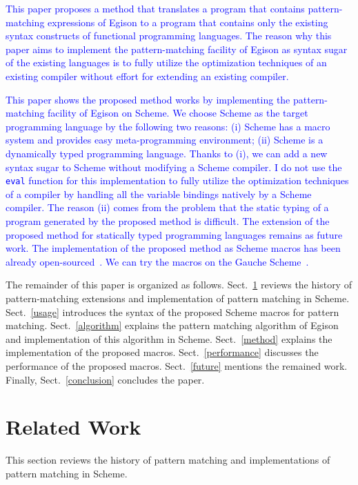 \documentclass[acmlarge]{acmart}
\newcommand{\new}[1]{\textcolor{blue}{#1}}
\begin{document}
\new{
This paper proposes a method that translates a program that contains pattern-matching expressions of Egison to a program that contains only the existing syntax constructs of functional programming languages.
The reason why this paper aims to implement the pattern-matching facility of Egison as syntax sugar of the existing languages is to fully utilize the optimization techniques of an existing compiler without effort for extending an existing compiler.
}%

\new{
This paper shows the proposed method works by implementing the pattern-matching facility of Egison on Scheme.
We choose Scheme as the target programming language by the following two reasons:
(i) Scheme has a macro system and provides easy meta-programming environment;
(ii) Scheme is a dynamically typed programming language.
Thanks to (i), we can add a new syntax sugar to Scheme without modifying a Scheme compiler.
I do not use the \lstinline{eval} function for this implementation to fully utilize the optimization techniques of a compiler by handling all the variable bindings natively by a Scheme compiler.
The reason (ii) comes from the problem that the static typing of a program generated by the proposed method is difficult.
The extension of the proposed method for statically typed programming languages remains as future work.
The implementation of the proposed method as Scheme  macros has been already open-sourced~\cite{egisonScheme}.
We can try the macros on the Gauche Scheme~\cite{gaucheWeb}.
}%

The remainder of this paper is organized as follows.
Sect.~\ref{history} reviews the history of pattern-matching extensions and implementation of pattern matching in Scheme.
Sect.~\ref{usage} introduces the syntax of the proposed Scheme macros for pattern matching.
Sect.~\ref{algorithm} explains the pattern matching algorithm of Egison and implementation of this algorithm in Scheme.
Sect.~\ref{method} explains the implementation of the proposed macros.
Sect.~\ref{performance} discusses the performance of the proposed macros.
Sect.~\ref{future} mentions the remained work.
Finally, Sect.~\ref{conclusion} concludes the paper.

\section{Related Work}\label{history}

This section reviews the history of pattern matching and implementations of pattern matching in Scheme.
\end{document}
